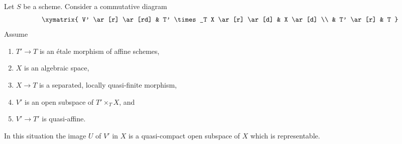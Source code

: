\begin{lemma}
\label{lemma-neighbourhood-scheme}
Let $S$ be a scheme. Consider a commutative diagram
$$
\xymatrix{
V' \ar[r] \ar[rd] & T' \times_T X \ar[r] \ar[d] & X \ar[d] \\
& T' \ar[r] & T
}
$$
Assume
\begin{enumerate}
\item $T' \to T$ is an \'etale morphism of affine schemes,
\item $X$ is an algebraic space,
\item $X \to T$ is a separated, locally quasi-finite morphism,
\item $V'$ is an open subspace of $T' \times_T X$, and
\item $V' \to T'$ is quasi-affine.
\end{enumerate}
In this situation the image $U$ of $V'$ in $X$ is a quasi-compact
open subspace of $X$ which is representable.
\end{lemma}

